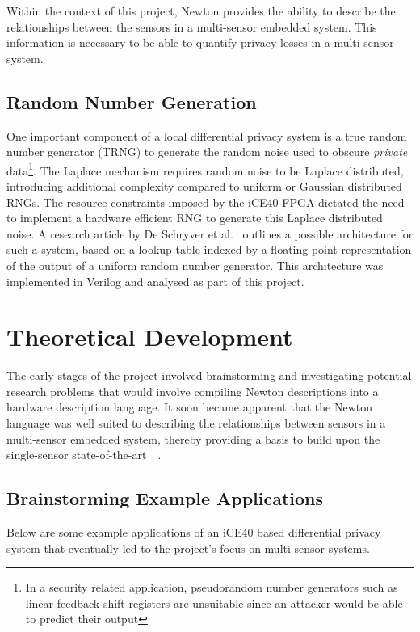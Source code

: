 \documentclass[12pt]{article}
\begin{document}
    Within the context of this project, Newton provides the ability to describe the relationships between the sensors in a multi-sensor embedded system. This information is necessary to be able to quantify privacy losses in a multi-sensor system.

  \subsection{Random Number Generation} \label{subsection:intro_rng}
    One important component of a local differential privacy system is a true random number generator (TRNG) to generate the random noise used to obscure \textit{private} data\footnote{In a security related application, pseudorandom number generators such as linear feedback shift registers are unsuitable since an attacker would be able to predict their output}. The Laplace mechanism requires random noise to be Laplace distributed, introducing additional complexity compared to uniform or Gaussian distributed RNGs. The resource constraints imposed by the iCE40 FPGA dictated the need to implement a hardware efficient RNG to generate this Laplace distributed noise. A research article by De Schryver et al.~\cite{DeSchryver} outlines a possible architecture for such a system, based on a lookup table indexed by a floating point representation of the output of a uniform random number generator. This architecture was implemented in Verilog and analysed as part of this project.


\newpage



%
%

\section{Theoretical Development}
  The early stages of the project involved brainstorming and investigating potential research problems that would involve compiling Newton descriptions into a hardware description language. It soon became apparent that the Newton language was well suited to describing the relationships between sensors in a multi-sensor embedded system, thereby providing a basis to build upon the single-sensor state-of-the-art~\cite{Choi2018GuaranteeingLD}~\cite{diffpriv_2006}.
  \subsection{Brainstorming Example Applications}
    Below are some example applications of an iCE40 based differential privacy system that eventually led to the project's focus on multi-sensor systems.
\end{document}
